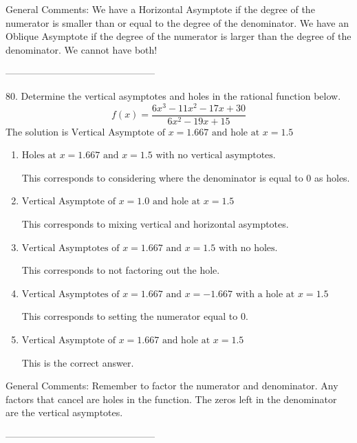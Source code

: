 \documentclass{extbook}[14pt]
\begin{document}
General Comments: We have a Horizontal Asymptote if the degree of the numerator is smaller than or equal to the degree of the denominator. We have an Oblique Asymptote if the degree of the numerator is larger than the degree of the denominator. We cannot have both!

-----------------------------------------------

80. Determine the vertical asymptotes and holes in the rational function below.
\[ f(x) = \frac{6x^{3} -11 x^{2} -17 x + 30}{6x^{2} -19 x + 15} \] 
The solution is $ \text{Vertical Asymptote of } x = 1.667 \text{ and hole at } x = 1.5 $ 

\begin{enumerate}[label=\Alph*.] 
\item $ \text{Holes at } x = 1.667 \text{ and } x = 1.5 \text{ with no vertical asymptotes.} $ 

 This corresponds to considering where the denominator is equal to 0 as holes. 
\item $ \text{Vertical Asymptote of } x = 1.0 \text{ and hole at } x = 1.5 $ 

 This corresponds to mixing vertical and horizontal asymptotes. 
\item $ \text{Vertical Asymptotes of } x = 1.667 \text{ and } x = 1.5 \text{ with no holes.} $ 

 This corresponds to not factoring out the hole. 
\item $ \text{Vertical Asymptotes of } x = 1.667 \text{ and } x = -1.667 \text{ with a hole at } x = 1.5 $ 

 This corresponds to setting the numerator equal to 0. 
\item $ \text{Vertical Asymptote of } x = 1.667 \text{ and hole at } x = 1.5 $ 

 This is the correct answer. 
\end{enumerate} 
 
General Comments: Remember to factor the numerator and denominator. Any factors that cancel are holes in the function. The zeros left in the denominator are the vertical asymptotes.

-----------------------------------------------
\end{document}
